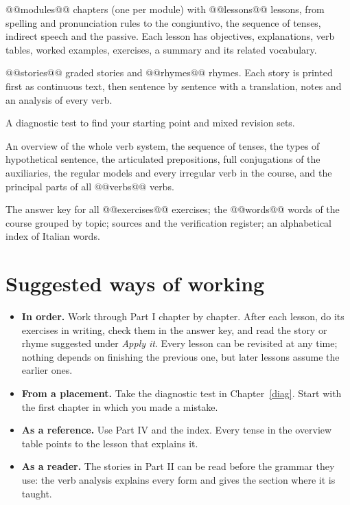 \begin{description}[leftmargin=0pt,itemsep=3pt]
\item[Part I, Course.] @@modules@@ chapters (one per module) with @@lessons@@ lessons, from spelling and pronunciation rules to the congiuntivo, the sequence of tenses, indirect speech and the passive. Each lesson has objectives, explanations, verb tables, worked examples, exercises, a summary and its related vocabulary.
\item[Part II, Reader.] @@stories@@ graded stories and @@rhymes@@ rhymes. Each story is printed first as continuous text, then sentence by sentence with a translation, notes and an analysis of every verb.
\item[Part III, Practice.] A diagnostic test to find your starting point and mixed revision sets.
\item[Part IV, Grammar reference.] An overview of the whole verb system, the sequence of tenses, the types of hypothetical sentence, the articulated prepositions, full conjugations of the auxiliaries, the regular models and every irregular verb in the course, and the principal parts of all @@verbs@@ verbs.
\item[Appendices.] The answer key for all @@exercises@@ exercises; the @@words@@ words of the course grouped by topic; sources and the verification register; an alphabetical index of Italian words.
\end{description}

\section*{Suggested ways of working}

\begin{itemize}
\item \textbf{In order.} Work through Part I chapter by chapter. After each lesson, do its exercises in writing, check them in the answer key, and read the story or rhyme suggested under \emph{Apply it}. Every lesson can be revisited at any time; nothing depends on finishing the previous one, but later lessons assume the earlier ones.
\item \textbf{From a placement.} Take the diagnostic test in Chapter~\ref{diag}. Start with the first chapter in which you made a mistake.
\item \textbf{As a reference.} Use Part IV and the index. Every tense in the overview table points to the lesson that explains it.
\item \textbf{As a reader.} The stories in Part II can be read before the grammar they use: the verb analysis explains every form and gives the section where it is taught.
\end{itemize}

